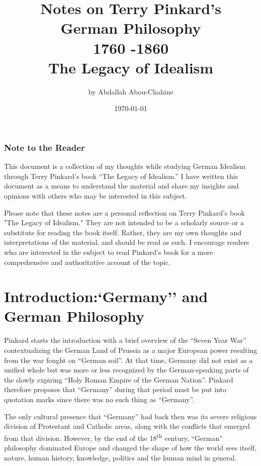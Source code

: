\documentclass{article}
\title{ \small Notes on Terry Pinkard's \\
\large German Philosophy\\ 
 1760 -1860 \\
The Legacy of Idealism
}
\author{ by Abdallah Abou-Chahine }
\date{\today}
\begin{document}
\maketitle

\newpage
\section*{Note to the Reader}

This document is a collection of my thoughts while studying German Idealism through Terry Pinkard’s book “The Legacy of Idealism.” I have written this document as a means to understand the material and share my insights and opinions with others who may be interested in this subject. 


Please note that these notes are a personal reflection on Terry Pinkard's book "The Legacy of Idealism." They are not intended to be a scholarly source or a substitute for reading the book itself. Rather, they are my own thoughts and interpretations of the material, and should be read as such. 
I encourage readers who are interested in the subject to read Pinkard's book for a more comprehensive and authoritative account of the topic.


\newpage
\part{Introduction:`Germany'' and German Philosophy}

\renewcommand{\thesubsection}{\Roman{subsection}}

 Pinkard starts the introduction with a brief overview of the ``Seven Year War'' contextualizing the German Land of Prussia as a major European power resulting from the war fought on ``German soil''.
  At that time, Germany did not exist as a unified whole but was more or less recognized by the German-speaking parts of the slowly expiring ``Holy Roman Empire of the German Nation''.
  Pinkard therefore proposes that ``Germany'' during that period must be put into quotation marks since there was no such thing as ``Germany''. 


  The only cultural presence that ``Germany'' had back then was its severe religious division of Protestant and Catholic areas, along with the conflicts that emerged from that division. 
  However, by the end of the 18\textsuperscript{th} century, ``German'' philosophy dominated Europe and changed the shape of how the world sees itself, nature, human history, knowledge, politics and the human mind in general. 
\end{document}
